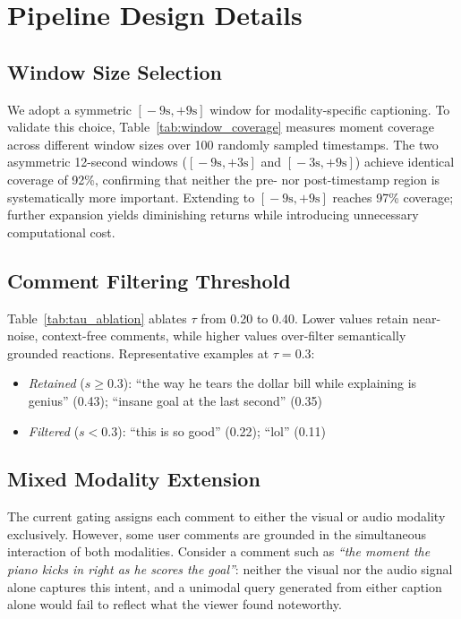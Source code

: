 \documentclass[11pt]{article}
\begin{document}


\appendix
\clearpage
\twocolumn

\section{Pipeline Design Details}
\label{sec:ablation_appendix}

\subsection{Window Size Selection}
We adopt a symmetric $[\!-\!9\mathrm{s},+9\mathrm{s}]$ window for modality-specific captioning.
To validate this choice, Table~\ref{tab:window_coverage} measures moment coverage across different window sizes over 100 randomly sampled timestamps.
The two asymmetric 12-second windows ($[\!-\!9\mathrm{s},+3\mathrm{s}]$ and $[\!-\!3\mathrm{s},+9\mathrm{s}]$) achieve identical coverage of 92\%, confirming that neither the pre- nor post-timestamp region is systematically more important.
Extending to $[\!-\!9\mathrm{s},+9\mathrm{s}]$ reaches 97\% coverage; further expansion yields diminishing returns while introducing unnecessary computational cost.


\subsection{Comment Filtering Threshold}
Table~\ref{tab:tau_ablation} ablates $\tau$ from 0.20 to 0.40.
Lower values retain near-noise, context-free comments, while higher values over-filter semantically grounded reactions.
Representative examples at $\tau\!=\!0.3$:
\begin{itemize}[leftmargin=*, itemsep=.2pt, topsep=1pt]
  \item \textit{Retained} ($s\!\geq\!0.3$): ``the way he tears the dollar bill while explaining is genius'' (0.43); ``insane goal at the last second'' (0.35)
  \item \textit{Filtered} ($s\!<\!0.3$): ``this is so good'' (0.22); ``lol'' (0.11)
\end{itemize}


\subsection{Mixed Modality Extension}
\label{sec:mixed_appendix}

The current gating assigns each comment to either the visual or audio modality exclusively.
However, some user comments are grounded in the simultaneous interaction of both modalities.
Consider a comment such as \textit{``the moment the piano kicks in right as he scores the goal''}: neither the visual nor the audio signal alone captures this intent, and a unimodal query generated from either caption alone would fail to reflect what the viewer found noteworthy.
\end{document}
